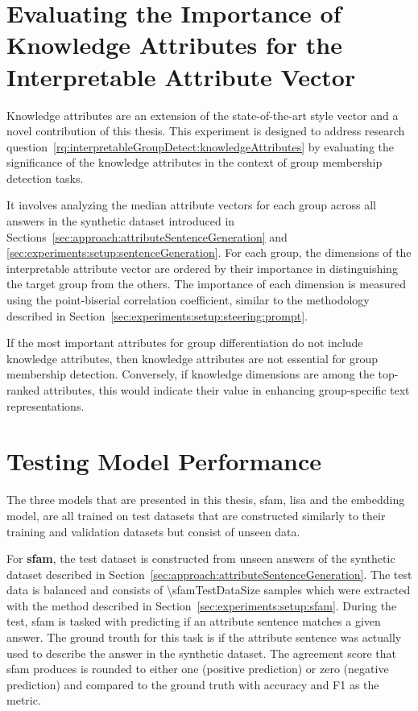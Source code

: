 \section{Evaluating the Importance of Knowledge Attributes for the Interpretable Attribute Vector}%
\label{sec:experiments:knowledgeAttributes}
Knowledge attributes are an extension of the state-of-the-art style vector and a novel contribution of this thesis. This experiment is designed to address research question~\ref{rq:interpretableGroupDetect:knowledgeAttributes} by evaluating the significance of the knowledge attributes in the context of group membership detection tasks.

It involves analyzing the median attribute vectors for each group across all answers in the synthetic dataset introduced in Sections~\ref{sec:approach:attributeSentenceGeneration} and \ref{sec:experiments:setup:sentenceGeneration}. For each group, the dimensions of the interpretable attribute vector are ordered by their importance in distinguishing the target group from the others. The importance of each dimension is measured using the point-biserial correlation coefficient, similar to the methodology described in Section~\ref{sec:experiments:setup:steering:prompt}.

If the most important attributes for group differentiation do not include knowledge attributes, then knowledge attributes are not essential for group membership detection. Conversely, if knowledge dimensions are among the top-ranked attributes, this would indicate their value in enhancing group-specific text representations.


\section{Testing Model Performance}
\label{sec:experiments:models}
The three models that are presented in this thesis, \ac{sfam}, \ac{lisa} and the embedding model, are all trained on test datasets that are constructed similarly to their training and validation datasets but consist of unseen data.

For \textbf{\ac{sfam}}, the test dataset is constructed from unseen answers of the synthetic dataset described in Section~\ref{sec:approach:attributeSentenceGeneration}. The test data is balanced and consists of \num{\sfamTestDataSize} samples which were extracted with the method described in Section~\ref{sec:experiments:setup:sfam}.
During the test, \ac{sfam} is tasked with predicting if an attribute sentence matches a given answer. The ground trouth for this task is if the attribute sentence was actually used to describe the answer in the synthetic dataset. The agreement score that \ac{sfam} produces is rounded to either one (positive prediction) or zero (negative prediction) and compared to the ground truth with accuracy and F1 as the metric.


